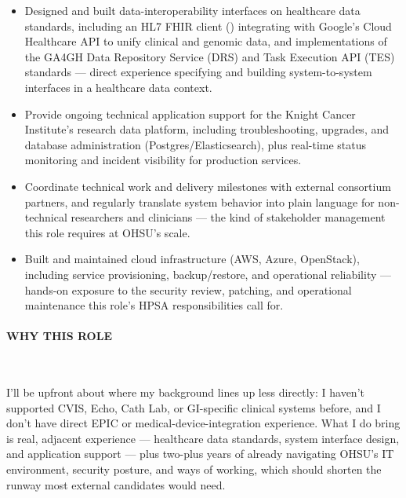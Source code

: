 \begin{itemize}

\item Designed and built data-interoperability interfaces on healthcare data standards, including an HL7 FHIR client () integrating with Google's Cloud Healthcare API to unify clinical and genomic data, and implementations of the GA4GH Data Repository Service (DRS) and Task Execution API (TES) standards --- direct experience specifying and building system-to-system interfaces in a healthcare data context.

\item Provide ongoing technical application support for the Knight Cancer Institute's research data platform, including troubleshooting, upgrades, and database administration (Postgres/Elasticsearch), plus real-time status monitoring and incident visibility for production services.

\item Coordinate technical work and delivery milestones with external  consortium partners, and regularly translate system behavior into plain language for non-technical researchers and clinicians --- the kind of stakeholder management this role requires at OHSU's scale.

\item Built and maintained cloud infrastructure (AWS, Azure, OpenStack), including service provisioning, backup/restore, and operational reliability --- hands-on exposure to the security review, patching, and operational maintenance this role's HPSA responsibilities call for.

\end{itemize}

\paragraph{WHY THIS ROLE}\

\vspace*{\baselineskip}

I'll be upfront about where my background lines up less directly: I haven't supported CVIS, Echo, Cath Lab, or GI-specific clinical systems before, and I don't have direct EPIC or medical-device-integration experience. What I do bring is real, adjacent experience --- healthcare data standards, system interface design, and application support --- plus two-plus years of already navigating OHSU's IT environment, security posture, and ways of working, which should shorten the runway most external candidates would need.

